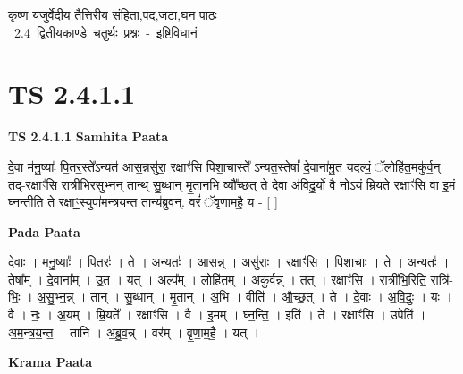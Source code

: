 \documentclass[17pt]{extarticle}
\begin{document}
\begin{titlepage}
    \begin{center}
 
\begin{sanskrit}
    { \Huge
    कृष्ण यजुर्वेदीय तैत्तिरीय संहिता,पद,जटा,घन पाठः 
    }
    \\
    \vspace{2.5cm}
    \mbox{ \Huge
    2.4      द्वितीयकाण्डे चतुर्थः प्रश्नः - इष्टिविधानं   }
\end{sanskrit}
\end{center}

\end{titlepage}
\tableofcontents
\pagebreak

\section*{ TS 2.4.1.1 }

\textbf{TS 2.4.1.1 } \newline
\textbf{Samhita Paata} \newline

दे॒वा म॑नु॒ष्याः᳚ पि॒तर॒स्ते᳚ऽन्यत॑ आस॒न्नसु॑रा॒ रक्षाꣳ॑सि पिशा॒चास्ते᳚ ऽन्यत॒स्तेषां᳚ दे॒वाना॑मु॒त यदल्पं॒ ॅलोहि॑त॒मकु॑र्व॒न् तद्-रक्षाꣳ॑सि॒ रात्री॑भिरसुभ्न॒न् तान्थ् सु॒ब्धान् मृ॒तान॒भि व्यौ᳚च्छ॒त् ते दे॒वा अ॑विदु॒र्यो वै नो॒ऽयं म्रि॒यते॒ रक्षाꣳ॑सि॒ वा इ॒मं घ्न॒न्तीति॒ ते रक्षाꣳ॒॒स्युपा॑मन्त्रयन्त॒ तान्य॑ब्रुव॒न्. वरं॑ ॅवृणामहै॒ य - [  ] \newline

\textbf{Pada Paata} \newline

दे॒वाः । म॒नु॒ष्याः᳚ । पि॒तरः॑ । ते । अ॒न्यतः॑ । आ॒स॒न्न् । असु॑राः । रक्षाꣳ॑सि । पि॒शा॒चाः । ते । अ॒न्यतः॑ । तेषा᳚म् । दे॒वाना᳚म् । उ॒त । यत् । अल्प᳚म् । लोहि॑तम् । अकु॑र्वन्न् । तत् । रक्षाꣳ॑सि । रात्री॑भि॒रिति॒ रात्रि॑-भिः॒ । अ॒सु॒भ्न॒न्न् । तान् । सु॒ब्धान् । मृ॒तान् । अ॒भि । वीति॑ । औ॒च्छ॒त् । ते । दे॒वाः । अ॒वि॒दुः॒ । यः । वै । नः॒ । अ॒यम् । म्रि॒यते᳚ । रक्षाꣳ॑सि । वै । इ॒मम् । घ्न॒न्ति॒ । इति॑ । ते । रक्षाꣳ॑सि । उपेति॑ । अ॒म॒न्त्र॒य॒न्त॒ । तानि॑ । अ॒ब्रु॒व॒न्न् । वर᳚म् । वृ॒णा॒म॒है॒ । यत् ।  \newline


\textbf{Krama Paata} \newline
\end{document}
